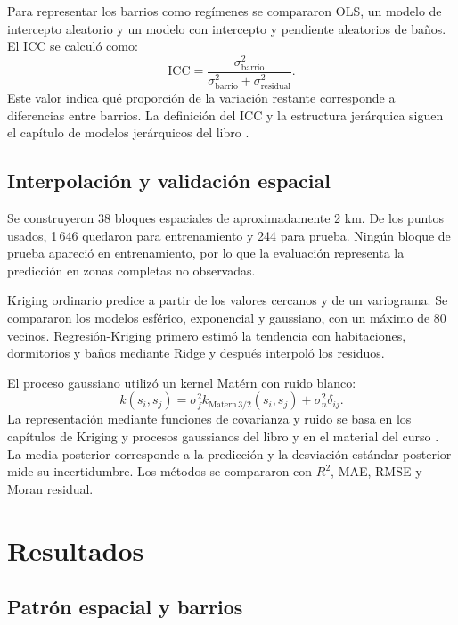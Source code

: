 \documentclass[conference]{IEEEtran}
\begin{document}
Para representar los barrios como regímenes se compararon OLS, un modelo de intercepto aleatorio y un modelo con intercepto y pendiente aleatorios de baños. El ICC se calculó como:
\begin{equation*}
    \mathrm{ICC}=
    \frac{\sigma^2_{\text{barrio}}}
    {\sigma^2_{\text{barrio}}+\sigma^2_{\text{residual}}}.
\end{equation*}
Este valor indica qué proporción de la variación restante corresponde a diferencias entre barrios. La definición del ICC y la estructura jerárquica siguen el capítulo de modelos jerárquicos del libro \cite{librocurso}.

\subsection{Interpolación y validación espacial}

Se construyeron 38 bloques espaciales de aproximadamente 2 km. De los puntos usados, 1\,646 quedaron para entrenamiento y 244 para prueba. Ningún bloque de prueba apareció en entrenamiento, por lo que la evaluación representa la predicción en zonas completas no observadas.

Kriging ordinario predice a partir de los valores cercanos y de un variograma. Se compararon los modelos esférico, exponencial y gaussiano, con un máximo de 80 vecinos. Regresión-Kriging primero estimó la tendencia con habitaciones, dormitorios y baños mediante Ridge y después interpoló los residuos.

El proceso gaussiano utilizó un kernel Matérn con ruido blanco:
\begin{equation*}
    k(s_i,s_j)=\sigma_f^2
    k_{\mathrm{Mat\acute ern}\,3/2}(s_i,s_j)
    +\sigma_n^2\delta_{ij}.
\end{equation*}
La representación mediante funciones de covarianza y ruido se basa en los capítulos de Kriging y procesos gaussianos del libro y en el material del curso \cite{librocurso,materialcurso}. La media posterior corresponde a la predicción y la desviación estándar posterior mide su incertidumbre. Los métodos se compararon con $R^2$, MAE, RMSE y Moran residual.

\section{Resultados}

\subsection{Patrón espacial y barrios}
\end{document}

